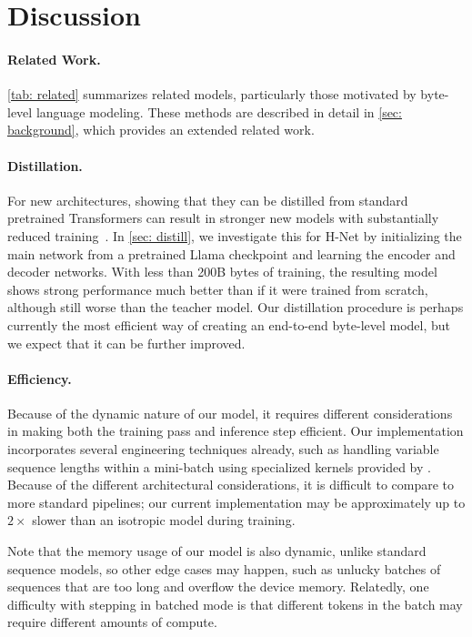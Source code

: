 \section{Discussion}
\label{sec: discussion}

\paragraph{Related Work.}
\cref{tab: related} summarizes related models, particularly those motivated by byte-level language modeling.
These methods are described in detail in \cref{sec: background}, which provides an extended related work.

\paragraph{Distillation.}
For new architectures,
showing that they can be distilled from standard pretrained Transformers can  result in stronger new models with substantially reduced training~\citep{MOHAWK}.
In \cref{sec: distill}, we investigate this for H-Net by initializing the main network from a pretrained Llama checkpoint and learning the encoder and decoder networks.
With less than 200B bytes of training, the resulting model shows strong performance much better than if it were trained from scratch, although still worse than the teacher model.
Our distillation procedure is perhaps currently the most efficient way of creating an end-to-end byte-level model, but we expect that it can be further improved.

\paragraph{Efficiency.}

Because of the dynamic nature of our model, it requires different considerations in making both the training pass and inference step efficient.
Our implementation incorporates several engineering techniques already, such as handling variable sequence lengths within a mini-batch using specialized kernels provided by \citet{FlashAttention2, Mamba2}.
Because of the different architectural considerations, it is difficult to compare to more standard pipelines;
our current implementation may be approximately up to $2\times$ slower than an isotropic model during training.

Note that the memory usage of our model is also dynamic, unlike standard sequence models, so other edge cases may happen, such as unlucky batches of sequences that are too long and overflow the device memory.
Relatedly, one difficulty with stepping \model{} in batched mode is that different tokens in the batch may require different amounts of compute.

